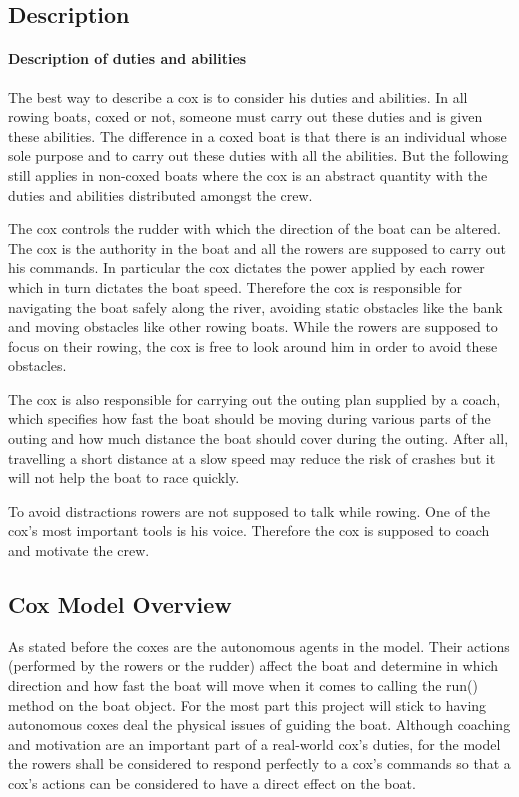       \subsection{Description}
      \paragraph{Description of duties and abilities}
      The best way to describe a cox is to consider his duties and abilities. In all rowing boats, coxed or not, someone must carry out these duties and is given these abilities. The difference in a coxed boat is that there is an individual whose sole purpose and to carry out these duties with all the abilities. But the following still applies in non-coxed boats where the cox is an abstract quantity with the duties and abilities distributed amongst the crew.
      
      The cox controls the rudder with which the direction of the boat can be altered. The cox is the authority in the boat and all the rowers are supposed to carry out his commands. In particular the cox dictates the power applied by each rower which in turn dictates the boat speed. Therefore the cox is responsible for navigating the boat safely along the river, avoiding static obstacles like the bank and moving obstacles like other rowing boats. While the rowers are supposed to focus on their rowing, the cox is free to look around him in order to avoid these obstacles. 
      
      The cox is also responsible for carrying out the outing plan supplied by a coach, which specifies how fast the boat should be moving during various parts of the outing and how much distance the boat should cover during the outing. After all, travelling a short distance at a slow speed may reduce the risk of crashes but it will not help the boat to race quickly.
      
      To avoid distractions rowers are not supposed to talk while rowing. One of the cox's most important tools is his voice. Therefore the cox is supposed to coach and motivate the crew.
      
      \subsection{Cox Model Overview}
      As stated before the coxes are the autonomous agents in the model. Their actions (performed by the rowers or the rudder) affect the boat and determine in which direction and how fast the boat will move when it comes to calling the run() method on the boat object. For the most part this project will stick to having autonomous coxes deal the physical issues of guiding the boat. Although coaching and motivation are an important part of a real-world cox's duties, for the model the rowers shall be considered to respond perfectly to a cox's commands so that a cox's actions can be considered to have a direct effect on the boat.
      
